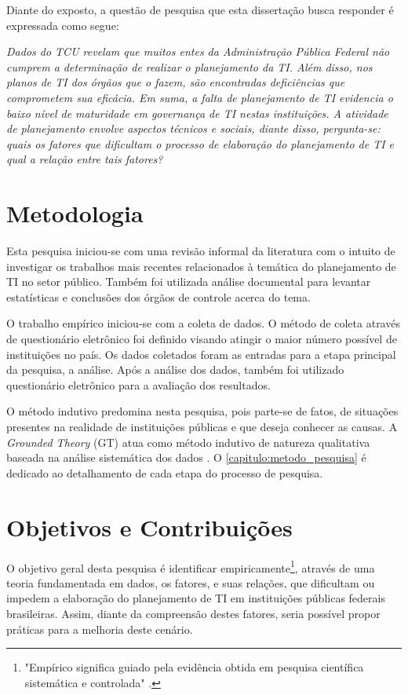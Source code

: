 Diante do exposto, a questão de pesquisa que esta dissertação busca responder é expressada como segue:

\textit{Dados do TCU revelam que muitos entes da Administração Pública Federal não cumprem a determinação de realizar o planejamento da TI. Além disso, nos planos de TI dos órgãos que o fazem, são encontradas deficiências que comprometem sua eficácia. Em suma, a falta de planejamento de TI evidencia o baixo nível de maturidade em governança de TI nestas instituições. A atividade de planejamento envolve aspectos técnicos e sociais, diante disso, pergunta-se: quais os fatores que dificultam o processo de elaboração do planejamento de TI e qual a relação entre tais fatores?}
	
\section{Metodologia}
Esta pesquisa iniciou-se com uma revisão informal da literatura com o intuito de investigar os trabalhos mais recentes relacionados à temática do planejamento de TI no setor público. Também foi utilizada análise documental para levantar estatísticas e conclusões dos órgãos de controle acerca do tema.

O trabalho empírico iniciou-se com a coleta de dados. O método de coleta através de questionário eletrônico foi definido visando atingir o maior número possível de instituições no país. Os dados coletados foram as entradas para a etapa principal da pesquisa, a análise. Após a análise dos dados, também foi utilizado questionário eletrônico para a avaliação dos resultados.

O método indutivo predomina nesta pesquisa, pois parte-se de fatos, de situações presentes na realidade de instituições públicas e que deseja conhecer as causas. A \textit{Grounded Theory} (GT) atua como método indutivo de natureza qualitativa baseada na análise sistemática dos dados \cite{patton:90, corbin:98}. O \autoref{capitulo:metodo_pesquisa} é dedicado ao detalhamento de cada etapa do processo de pesquisa.

\section{Objetivos e Contribuições}

O objetivo geral desta pesquisa é identificar empiricamente\footnote{"Empírico significa guiado pela evidência obtida em pesquisa científica sistemática e controlada" \cite{kerlinger:80}.}, através de uma teoria fundamentada em dados, os fatores, e suas relações, que dificultam ou impedem a elaboração do planejamento de TI em instituições públicas federais brasileiras. Assim, diante da compreensão destes fatores, seria possível propor práticas para a melhoria deste cenário.

